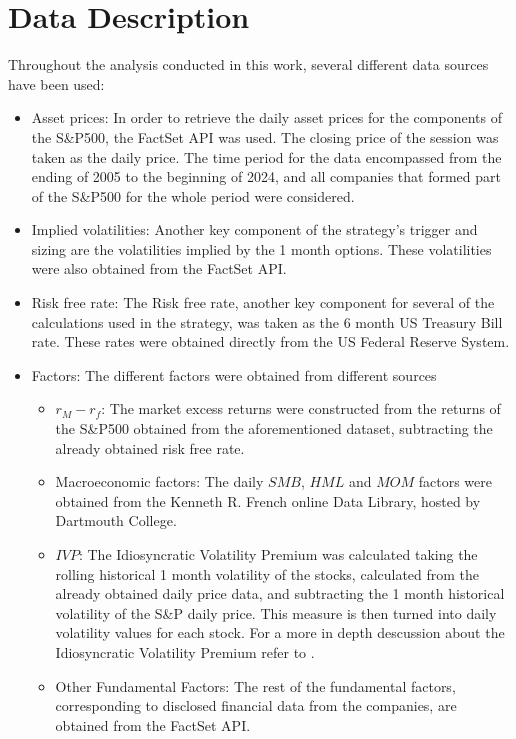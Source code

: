 \section{Data Description}
\label{sec:data-description}
Throughout the analysis conducted in this work, several different data sources have been used:
\begin{itemize}
    \item Asset prices: In order to retrieve the daily asset prices for the components of the S\&P500, the FactSet API was used. The closing price of the session was taken as the daily price. The time period for the data encompassed from the ending of 2005 to the beginning of 2024, and all companies that formed part of the S\&P500 for the whole period were considered. 
    \item Implied volatilities: Another key component of the strategy's trigger and sizing are the volatilities implied by the 1 month options. These volatilities were also obtained from the FactSet API. 
    \item Risk free rate: The Risk free rate, another key component for several of the calculations used in the strategy, was taken as the 6 month US Treasury Bill rate. These rates were obtained directly from the US Federal Reserve System.
    \item Factors: The different factors were obtained from different sources
    \begin{itemize}
        \item $r_M-r_f$: The market excess returns were constructed from the returns of the S\&P500 obtained from the aforementioned dataset, subtracting the already obtained risk free rate.
        \item Macroeconomic factors: The daily $SMB$, $HML$ and $MOM$ factors were obtained from the Kenneth R. French online Data Library, hosted by Dartmouth College.
        \item $IVP$: The Idiosyncratic Volatility Premium was calculated taking the rolling historical 1 month volatility of the stocks, calculated from the already obtained daily price data, and subtracting the 1 month historical volatility of the S\&P daily price. This measure is then turned into daily volatility values for each stock. For a more in depth descussion about the Idiosyncratic Volatility Premium refer to \cite{ioannis_2024}.
        \item Other Fundamental Factors: The rest of the fundamental factors, corresponding to disclosed financial data from the companies, are obtained from the FactSet API. 
    \end{itemize}
\end{itemize}